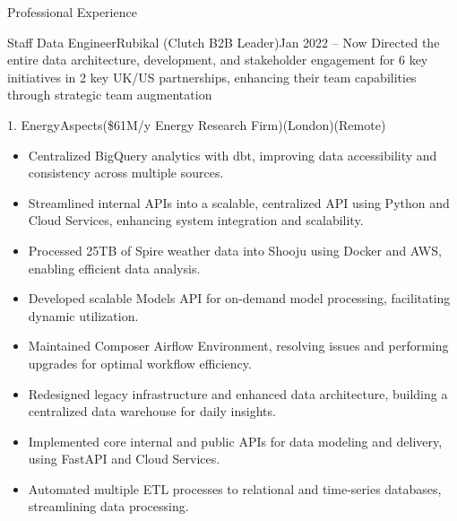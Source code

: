 \documentclass[]{ahmedamrcv}
\begin{document}
	\begin{cvsection}{Professional Experience}
            \begin{cvsubsection}{Staff Data Engineer}{Rubikal (Clutch B2B Leader)}{Jan 2022 -- Now}
            Directed the entire data architecture, development, and stakeholder engagement for 6 key initiatives in 2 key UK/US partnerships, enhancing their team capabilities through strategic team augmentation

                \begin{cvsubsection}{1. EnergyAspects}{(\$61M/y Energy Research Firm)}{(London)(Remote)}
    			\begin{itemize}
                        \item Centralized BigQuery analytics with dbt, improving data accessibility and consistency across multiple sources.
        
                        \item Streamlined internal APIs into a scalable, centralized API using Python and Cloud Services, enhancing system integration and scalability.
                            
                        \item Processed 25TB of Spire weather data into Shooju using Docker and AWS, enabling efficient data analysis.
                            
                        \item Developed scalable Models API for on-demand model processing, facilitating dynamic utilization.
                            
                        \item Maintained Composer Airflow Environment, resolving issues and performing upgrades for optimal workflow efficiency.
                            
                        \item Redesigned legacy infrastructure and enhanced data architecture, building a centralized data warehouse for daily insights.
                            
                        \item Implemented core internal and public APIs for data modeling and delivery, using FastAPI and Cloud Services.
                            
                        \item Automated multiple ETL processes to relational and time-series databases, streamlining data processing.
                            

\end{itemize}
\end{cvsubsection}
\end{cvsubsection}
\end{cvsection}
\end{document}
